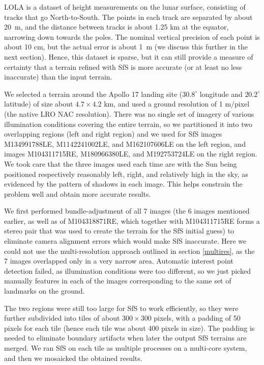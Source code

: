 \documentclass[12pt,oneside]{article}
\begin{document}
LOLA is a dataset of height measurements on the lunar surface, consisting
of tracks that go North-to-South. The points in each track are separated by about 20~m,
and the distance between tracks is about 1.25 km at the equator, narrowing down 
towards the poles. The nominal vertical precision of each point is about 10 cm, but the actual error
is about 1~m (we discuss this further in the next section). Hence, this dataset is sparse, but it can still provide a measure of certainty that 
a terrain refined with SfS is more accurate (or at least no less inaccurate) than
the input terrain.

We selected a terrain around the Apollo 17 landing site ($30.8^\circ$
longitude and $20.2^\circ$ latitude) of size about $4.7 \times 4.2$ km,
and used a ground resolution of 1 m/pixel (the native LRO NAC
resolution). There was no single set of imagery of various illumination
conditions covering the entire terrain, so we partitioned it into two
overlapping regions (left and right region) and we used for SfS images
M134991788LE, M1142241002LE, and M162107606LE on the left region, and images
M104311715RE, M180966380LE, and M192753724LE on the right region. We
took care that the three images used each time are with the Sun being
positioned respectively reasonably left, right, and relatively high in
the sky, as evidenced by the pattern of shadows in each image. This
helps constrain the problem well and obtain more accurate results.

We first performed bundle-adjustment of all 7 images (the 6 images
mentioned earlier, as well as of M104318871RE, which together with
M104311715RE forms a stereo pair that was used to create the terrain for the
SfS initial guess) to eliminate camera alignment errors which would make SfS
inaccurate. Here we could not use the multi-resolution approach outlined
in section \ref{multires}, as the 7 images overlapped only in a very
narrow area. Automatic interest point detection failed, as illumination
conditions were too different, so we just picked manually features in
each of the images corresponding to the same set of landmarks on the
ground.

The two regions were still too large for SfS to work efficiently,
so they were further subdivided into tiles of about $300 \times 300$ pixels,
with a padding of 50 pixels for each tile (hence each tile was about 400 pixels in size).
The padding is needed to eliminate boundary artifacts when later the output SfS terrains are merged. We ran SfS on each tile
as multiple processes on a multi-core system, and then we mosaicked the obtained results.
\end{document}
